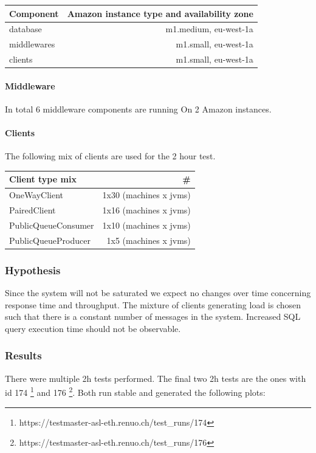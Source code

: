 \documentclass[milestone1.tex]{subfiles}
\begin{document}
\begin{tabular}{|l|r|}
\hline 
\textbf{Component} & \textbf{Amazon instance type and availability zone} \\
\hline 
database & m1.medium, eu-west-1a \\ 
middlewares & m1.small, eu-west-1a \\ 
clients & m1.small, eu-west-1a \\ 
\hline 
\end{tabular}


\paragraph{Middleware} In total 6 middleware components are running On 2 Amazon instances.

\paragraph{Clients} The following mix of clients are used for the 2 hour test.\\

\begin{tabular}{|l|r|}
\hline 
\textbf{Client type mix} & \textbf{\#} \\ 
\hline 
OneWayClient & 1x30 (machines x jvms)  \\ 
\hline 
PairedClient & 1x16 (machines x jvms) \\ 
\hline 
PublicQueueConsumer & 1x10 (machines x jvms) \\ 
\hline 
PublicQueueProducer & 1x5 (machines x jvms) \\ 
\hline 
\end{tabular} 


\subsubsection{Hypothesis}
Since the system will not be saturated we expect no changes over time concerning response time and throughput. The mixture of clients generating load is chosen such that there is a constant number of messages in the system. Increased SQL query execution time should not be observable.

\subsubsection{Results}
There were multiple 2h tests performed. The final two 2h tests are the ones with id 174 \footnote{https://testmaster-asl-eth.renuo.ch/test\_runs/174} and 176 \footnote{https://testmaster-asl-eth.renuo.ch/test\_runs/176}. Both run stable and generated the following plots:
\end{document}
